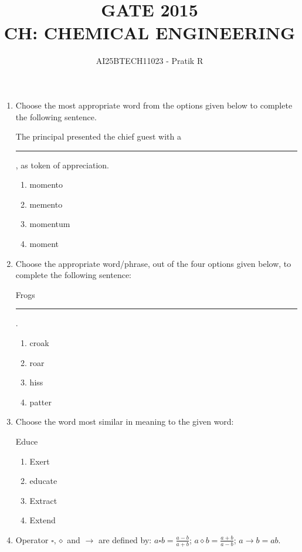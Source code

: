 \documentclass[journal,12pt,onecolumn]{IEEEtran}
\theoremstyle{remark}
\begin{document}
\title{
GATE 2015 \\
CH: CHEMICAL ENGINEERING}
\author{AI25BTECH11023 - Pratik R}
\maketitle
\renewcommand{\thefigure}{\theenumi}

\begin{enumerate}
    \item Choose the most appropriate word from the options given below to complete the following sentence.

    The principal presented the chief guest with a \rule{40pt}{0.1mm}, as token of appreciation.

\hfill{}
\begin{enumerate}
        \item momento
         \item memento
          \item momentum
           \item moment
\end{enumerate}

    \item Choose the appropriate word/phrase, out of the four options given below, to complete the following sentence:

    Frogs \rule{40pt}{0.1mm}.

\hfill{}
\begin{enumerate}
    \item croak
     \item roar
      \item hiss
       \item patter
\end{enumerate}

    \item Choose the word most similar in meaning to the given word:

    Educe

\hfill{}
\begin{enumerate}
    \item Exert
     \item educate
      \item Extract
       \item Extend
\end{enumerate}

    \item Operator $\square , \diamond$ and $\to$ are defined by: $a \square b = \frac{a-b}{a+b}$; $a \diamond b = \frac{a+b}{a-b}$; $a \to b = ab$.


\end{enumerate}
\end{document}

